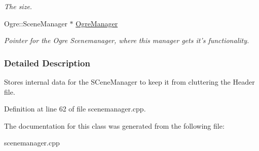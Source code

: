 \begin{DoxyCompactItemize}
\begin{DoxyCompactList}\small\item\em The size. \item\end{DoxyCompactList}\item 
\hypertarget{classphys_1_1internal_1_1SceneManagerData_a685cc93f5a9070ae7d78f6eaa62db00a}{
Ogre::SceneManager $\ast$ \hyperlink{classphys_1_1internal_1_1SceneManagerData_a685cc93f5a9070ae7d78f6eaa62db00a}{OgreManager}}
\label{d7/dbb/classphys_1_1internal_1_1SceneManagerData_a685cc93f5a9070ae7d78f6eaa62db00a}

\begin{DoxyCompactList}\small\item\em Pointer for the Ogre Scenemanager, where this manager gets it's functionality. \item\end{DoxyCompactList}\end{DoxyCompactItemize}


\subsubsection{Detailed Description}
Stores internal data for the SCeneManager to keep it from cluttering the Header file. 

Definition at line 62 of file scenemanager.cpp.



The documentation for this class was generated from the following file:\begin{DoxyCompactItemize}
\item 
scenemanager.cpp\end{DoxyCompactItemize}
